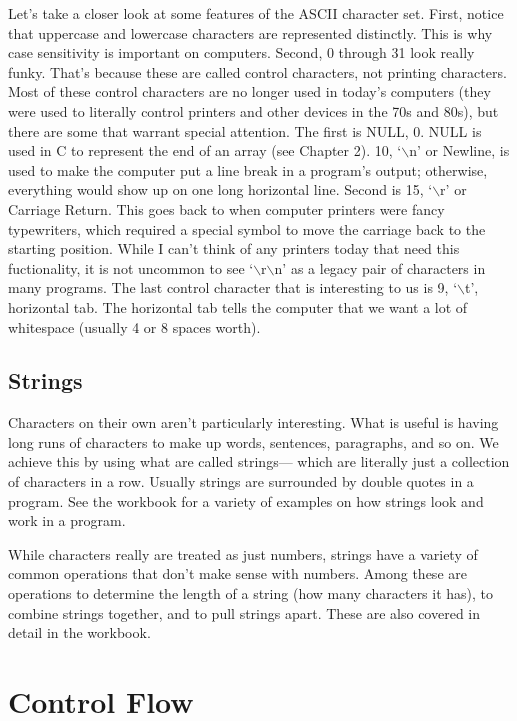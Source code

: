 

Let's take a closer look at some features of the ASCII character set. First,
notice that uppercase and lowercase characters are represented distinctly.
This is why case sensitivity is important on computers. Second, 0 through 31
look really funky. That's because these are called control characters, not
printing characters. Most of these control characters are no longer used in
today's computers (they were used to literally control printers and other
devices in the 70s and 80s), but there are some that warrant special
attention. The first is NULL, 0. NULL is used in C to represent the end of an
array (see Chapter 2). 10, `$\backslash$n' or Newline, is used to make the
computer put a line break in a program's output; otherwise, everything would
show up on one long horizontal line. Second is 15, `$\backslash$r' or Carriage
Return. This goes back to when computer printers were fancy typewriters, which
required a special symbol to move the carriage back to the starting position.
While I can't think of any printers today that need this fuctionality, it is
not uncommon to see `$\backslash$r$\backslash$n' as a legacy pair of
characters in many programs. The last control character that is interesting to
us is 9, `$\backslash$t', horizontal tab. The horizontal tab tells the
computer that we want a lot of whitespace (usually 4 or 8 spaces worth).

\subsection{Strings}

Characters on their own aren't particularly interesting. What is useful is
having long runs of characters to make up words, sentences, paragraphs, and so
on. We achieve this by using what are called strings--- which are literally
just a collection of characters in a row. Usually strings are surrounded by
double quotes in a program. See the workbook for a variety of examples on how
strings look and work in a program.

While characters really are treated as just numbers, strings have a variety of
common operations that don't make sense with numbers. Among these are
operations to determine the length of a string (how many characters it has),
to combine strings together, and to pull strings apart. These are also covered
in detail in the workbook.

\section{Control Flow}

